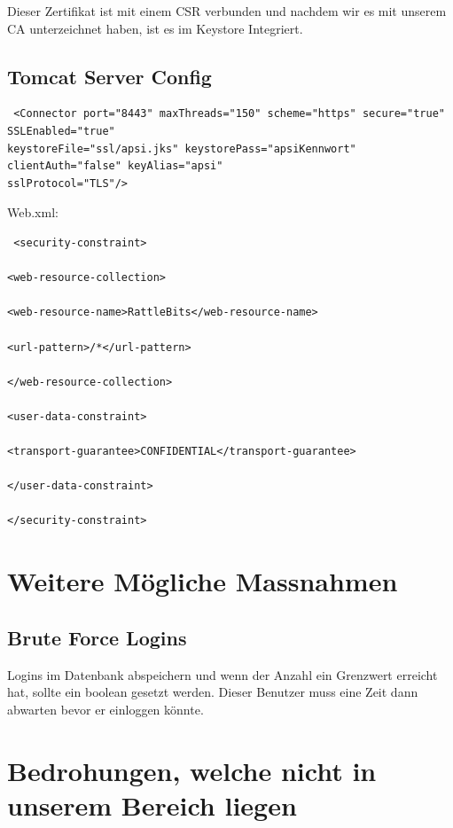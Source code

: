\documentclass[10pt]{scrartcl}
\begin{document}
Dieser Zertifikat ist mit einem CSR verbunden und nachdem wir es mit unserem CA unterzeichnet haben, ist es im Keystore Integriert.

\subsection{Tomcat Server Config}
\begin{verbatim}
 <Connector port="8443" maxThreads="150" scheme="https" secure="true" SSLEnabled="true" 
keystoreFile="ssl/apsi.jks" keystorePass="apsiKennwort" clientAuth="false" keyAlias="apsi" 
sslProtocol="TLS"/>
\end{verbatim}

Web.xml: \\
\begin{verbatim}
 <security-constraint>

<web-resource-collection>

<web-resource-name>RattleBits</web-resource-name>

<url-pattern>/*</url-pattern>

</web-resource-collection>

<user-data-constraint>

<transport-guarantee>CONFIDENTIAL</transport-guarantee>

</user-data-constraint>

</security-constraint>
\end{verbatim}


\section{Weitere Mögliche Massnahmen}

\subsection{Brute Force Logins}
Logins im Datenbank abspeichern und wenn der Anzahl ein Grenzwert erreicht hat, sollte ein boolean gesetzt werden. 
Dieser Benutzer muss eine Zeit dann abwarten bevor er einloggen könnte.

\section{Bedrohungen, welche nicht in unserem Bereich liegen}

 
\end{document}
